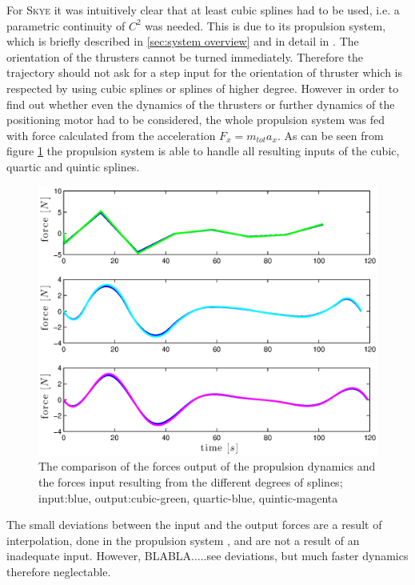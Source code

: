  For \textsc{Skye} it was intuitively clear that at least cubic splines had to be used, i.e. a parametric continuity of $C^2$ was needed. This is due to its propulsion system, which is briefly described in \ref{sec:system overview} and in detail in \cite{schaffnervu}. The orientation of the thrusters cannot be turned immediately. Therefore the trajectory should not ask for a step input for the orientation of thruster which is respected by using cubic splines or splines of higher degree. However in order to find out whether even the dynamics of the thrusters or further dynamics of the positioning motor had to be considered, the whole propulsion system was fed with force calculated from the acceleration $F_x=m_{tot}a_x$. As can be seen from figure \ref{fig:forces} the propulsion system is able to handle all resulting inputs of the cubic, quartic and quintic splines.
 
\begin{figure}[H]
  \begin{minipage}[t]{0.96\textwidth}
    \includegraphics[width = \textwidth]{graphics/forces.eps}
  \end{minipage}
  \caption{The comparison of the forces output of the propulsion dynamics and the forces input resulting from the different degrees of splines; input:blue, output:cubic-green, quartic-blue, quintic-magenta}
\label{fig:forces}
\end{figure} 

The small deviations between the input and the output forces are a result of interpolation, done in the propulsion system \cite{schaffnervu}, and are not a result of an inadequate input. However, BLABLA.....see deviations, but much faster dynamics therefore neglectable.

